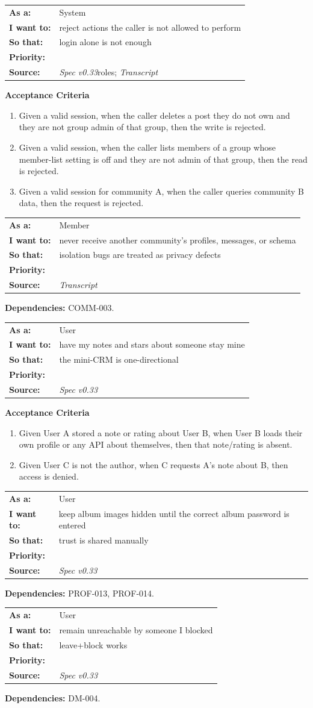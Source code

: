 \documentclass[11pt,a4paper]{article}
\makeatletter
\newcommand{\priPzero}{\colorbox{p0}{\makebox[4.6em]{\textcolor{white}{\scriptsize\bfseries P0 V1}}}}
\newcommand{\srcSpec}{\textit{Spec v0.33}}
\newcommand{\srcTx}{\textit{Transcript}}
\newenvironment{story}[1]{%
  \Needspace{10\baselineskip}%
  \vspace{0.7em}%
  \noindent
  \colorbox{navy}{\makebox[\dimexpr\textwidth-2\fboxsep\relax][l]{\textcolor{white}{\bfseries\ #1}}}%
  \par\vspace{0.35em}%
}{\par\vspace{0.55em}}
\newcommand{\storymeta}[5]{%
  \noindent
  \begin{tabularx}{\textwidth}{@{}>{\bfseries}l X@{}}
    As a: & #1 \\
    I want to: & #2 \\
    So that: & #3 \\
    Priority: & #4 \\
    Source: & #5 \\
  \end{tabularx}
  \par\vspace{0.3em}
}
\newcommand{\achead}{\noindent\textbf{Acceptance Criteria}\par}
\newcommand{\deps}[1]{\noindent\textbf{Dependencies:} #1\par}
\makeatother
\begin{document}
\begin{story}{SEC-001 --- Authorise every write by role and scope}
\storymeta{System}{reject actions the caller is not allowed to perform}{login alone is not enough}{\priPzero}{\srcSpec roles; \srcTx}
\achead
\begin{enumerate}
  \item Given a valid session, when the caller deletes a post they do not own and they are not group admin of that group, then the write is rejected.
  \item Given a valid session, when the caller lists members of a group whose member-list setting is off and they are not admin of that group, then the read is rejected.
  \item Given a valid session for community A, when the caller queries community B data, then the request is rejected.
\end{enumerate}
\end{story}

\begin{story}{SEC-002 --- Community isolation on all member data}
\storymeta{Member}{never receive another community's profiles, messages, or schema}{isolation bugs are treated as privacy defects}{\priPzero}{\srcTx}
\deps{COMM-003.}
\end{story}

\begin{story}{SEC-003 --- Private notes and ratings never leak to the subject}
\storymeta{User}{have my notes and stars about someone stay mine}{the mini-CRM is one-directional}{\priPzero}{\srcSpec}
\achead
\begin{enumerate}
  \item Given User A stored a note or rating about User B, when User B loads their own profile or any API about themselves, then that note/rating is absent.
  \item Given User C is not the author, when C requests A's note about B, then access is denied.
\end{enumerate}
\end{story}

\begin{story}{SEC-004 --- Locked album password is a second gate}
\storymeta{User}{keep album images hidden until the correct album password is entered}{trust is shared manually}{\priPzero}{\srcSpec}
\deps{PROF-013, PROF-014.}
\end{story}

\begin{story}{SEC-005 --- Blocked users cannot start a new DM}
\storymeta{User}{remain unreachable by someone I blocked}{leave+block works}{\priPzero}{\srcSpec}
\deps{DM-004.}
\end{story}
\end{document}
